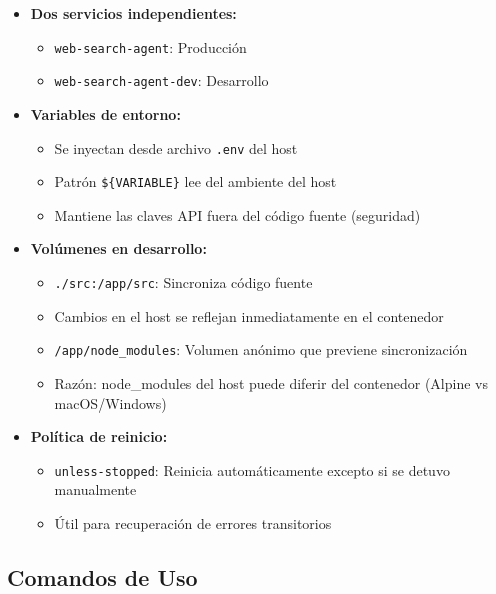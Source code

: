 \documentclass[12pt,a4paper]{article}
\begin{document}
\begin{itemize}
    \item \textbf{Dos servicios independientes:}
    \begin{itemize}
        \item \texttt{web-search-agent}: Producción
        \item \texttt{web-search-agent-dev}: Desarrollo
    \end{itemize}

    \item \textbf{Variables de entorno:}
    \begin{itemize}
        \item Se inyectan desde archivo \texttt{.env} del host
        \item Patrón \texttt{\$\{VARIABLE\}} lee del ambiente del host
        \item Mantiene las claves API fuera del código fuente (seguridad)
    \end{itemize}

    \item \textbf{Volúmenes en desarrollo:}
    \begin{itemize}
        \item \texttt{./src:/app/src}: Sincroniza código fuente
        \item Cambios en el host se reflejan inmediatamente en el contenedor
        \item \texttt{/app/node\_modules}: Volumen anónimo que previene sincronización
        \item Razón: node\_modules del host puede diferir del contenedor (Alpine vs macOS/Windows)
    \end{itemize}

    \item \textbf{Política de reinicio:}
    \begin{itemize}
        \item \texttt{unless-stopped}: Reinicia automáticamente excepto si se detuvo manualmente
        \item Útil para recuperación de errores transitorios
    \end{itemize}
\end{itemize}

\subsection{Comandos de Uso}
\end{document}
